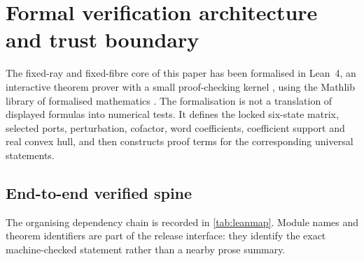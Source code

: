 \section{Formal verification architecture and trust boundary}
\label{sec:formalisation}

The fixed-ray and fixed-fibre core of this paper has been formalised in Lean~4,
an interactive theorem prover with a small proof-checking kernel
\parencite{deMouraUllrich2021}, using the Mathlib library of formalised
mathematics \parencite{MathlibCommunity2020}.  The formalisation is not a
translation of displayed formulas into numerical tests.  It defines the locked
six-state matrix, selected ports, perturbation, cofactor, word coefficients,
coefficient support and real convex hull, and then constructs proof terms for
the corresponding universal statements.

\subsection{End-to-end verified spine}

The organising dependency chain is recorded in \cref{tab:leanmap}.  Module
names and theorem identifiers are part of the release interface: they identify
the exact machine-checked statement rather than a nearby prose summary.

